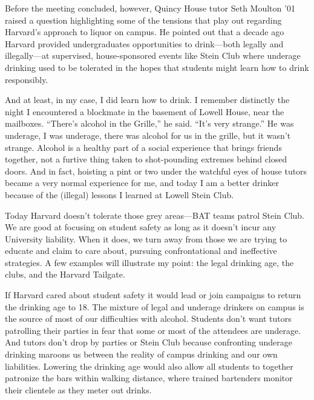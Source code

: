 Before the meeting concluded, however, Quincy House tutor Seth Moulton '01
raised a question highlighting some of the tensions that play out regarding
Harvard's approach to liquor on campus. He pointed out that a decade ago
Harvard provided undergraduates opportunities to drink---both legally and
illegally---at supervised, house-sponsored events like Stein Club where
underage drinking used to be tolerated in the hopes that students might learn
how to drink responsibly.

And at least, in my case, I did learn how to drink. I remember distinctly the
night I encountered a blockmate in the basement of Lowell House, near the
mailboxes. ``There's alcohol in the Grille,'' he said. ``It's very strange.''
He was underage, I was underage, there was alcohol for us in the grille, but
it wasn't strange. Alcohol is a healthy part of a social experience that
brings friends together, not a furtive thing taken to shot-pounding extremes
behind closed doors. And in fact, hoisting a pint or two under the watchful
eyes of house tutors became a very normal experience for me, and today I am a
better drinker because of the (illegal) lessons I learned at Lowell Stein
Club.

Today Harvard doesn't tolerate those grey areas---BAT teams patrol Stein
Club. We are good at focusing on student safety as long as it doesn't incur
any University liability. When it does, we turn away from those we are trying
to educate and claim to care about, pursuing confrontational and ineffective
strategies. A few examples will illustrate my point: the legal drinking age,
the clubs, and the Harvard Tailgate.

If Harvard cared about student safety it would lead or join campaigns to
return the drinking age to 18. The mixture of legal and underage drinkers on
campus is the source of most of our difficulties with alcohol. Students don't
want tutors patrolling their parties in fear that some or most of the
attendees are underage. And tutors don't drop by parties or Stein Club
because confronting underage drinking maroons us between the reality of
campus drinking and our own liabilities. Lowering the drinking age would also
allow all students to together patronize the bars within walking distance,
where trained bartenders monitor their clientele as they meter out drinks.

